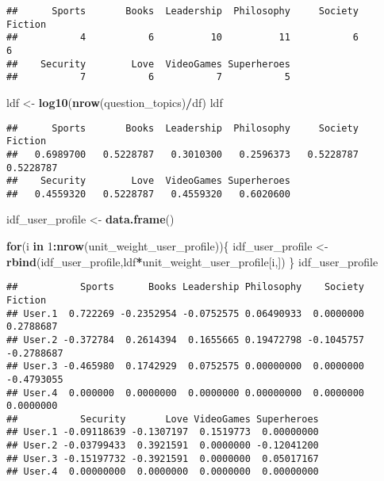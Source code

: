 \documentclass[]{article}
\newenvironment{Shaded}{\begin{snugshade}}{\end{snugshade}}
\newcommand{\ControlFlowTok}[1]{\textcolor[rgb]{0.13,0.29,0.53}{\textbf{#1}}}
\newcommand{\DecValTok}[1]{\textcolor[rgb]{0.00,0.00,0.81}{#1}}
\newcommand{\KeywordTok}[1]{\textcolor[rgb]{0.13,0.29,0.53}{\textbf{#1}}}
\newcommand{\NormalTok}[1]{#1}
\newcommand{\OperatorTok}[1]{\textcolor[rgb]{0.81,0.36,0.00}{\textbf{#1}}}
\newcommand{\StringTok}[1]{\textcolor[rgb]{0.31,0.60,0.02}{#1}}
\begin{document}
\begin{verbatim}
##      Sports       Books  Leadership  Philosophy     Society     Fiction 
##           4           6          10          11           6           6 
##    Security        Love  VideoGames Superheroes 
##           7           6           7           5
\end{verbatim}

\begin{Shaded}
\begin{Highlighting}[]
\NormalTok{ldf <-}\StringTok{ }\KeywordTok{log10}\NormalTok{(}\KeywordTok{nrow}\NormalTok{(question_topics)}\OperatorTok{/}\NormalTok{df)}
\NormalTok{ldf}
\end{Highlighting}
\end{Shaded}

\begin{verbatim}
##      Sports       Books  Leadership  Philosophy     Society     Fiction 
##   0.6989700   0.5228787   0.3010300   0.2596373   0.5228787   0.5228787 
##    Security        Love  VideoGames Superheroes 
##   0.4559320   0.5228787   0.4559320   0.6020600
\end{verbatim}

\begin{Shaded}
\begin{Highlighting}[]
\NormalTok{idf_user_profile <-}\StringTok{ }\KeywordTok{data.frame}\NormalTok{()}


\ControlFlowTok{for}\NormalTok{(i }\ControlFlowTok{in} \DecValTok{1}\OperatorTok{:}\KeywordTok{nrow}\NormalTok{(unit_weight_user_profile))\{}
\NormalTok{  idf_user_profile <-}\StringTok{ }\KeywordTok{rbind}\NormalTok{(idf_user_profile,ldf}\OperatorTok{*}\NormalTok{unit_weight_user_profile[i,])}
\NormalTok{\}}
\NormalTok{idf_user_profile}
\end{Highlighting}
\end{Shaded}

\begin{verbatim}
##           Sports      Books Leadership Philosophy    Society    Fiction
## User.1  0.722269 -0.2352954 -0.0752575 0.06490933  0.0000000  0.2788687
## User.2 -0.372784  0.2614394  0.1655665 0.19472798 -0.1045757 -0.2788687
## User.3 -0.465980  0.1742929  0.0752575 0.00000000  0.0000000 -0.4793055
## User.4  0.000000  0.0000000  0.0000000 0.00000000  0.0000000  0.0000000
##           Security       Love VideoGames Superheroes
## User.1 -0.09118639 -0.1307197  0.1519773  0.00000000
## User.2 -0.03799433  0.3921591  0.0000000 -0.12041200
## User.3 -0.15197732 -0.3921591  0.0000000  0.05017167
## User.4  0.00000000  0.0000000  0.0000000  0.00000000
\end{verbatim}
\end{document}
